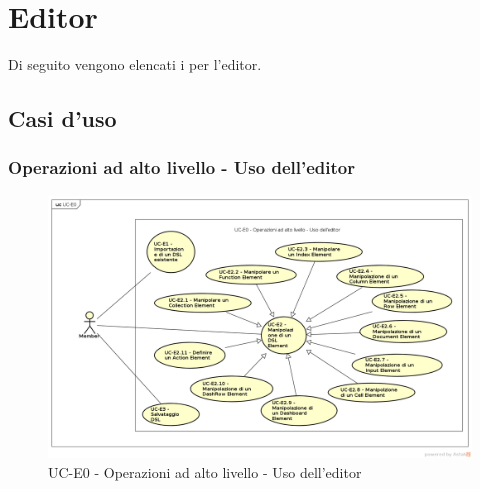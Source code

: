 \section{Editor}

Di seguito vengono elencati i  per l'editor.

\subsection{Casi d'uso}


\subsubsection{Operazioni ad alto livello - Uso dell'editor}
    \begin{figure}[H]
      \begin{center}
        \includegraphics[width=12cm]{res/img/UCEditor/UC-E0.png}
      \caption{UC-E0 - Operazioni ad alto livello - Uso dell'editor}
      \end{center} 
    \end{figure}    
    
